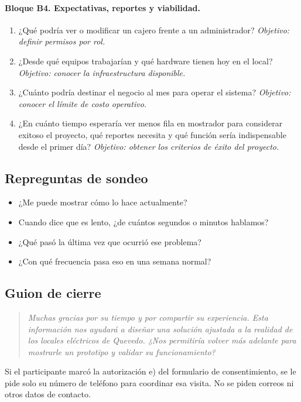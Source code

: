 \paragraph{Bloque B4. Expectativas, reportes y viabilidad.}
\begin{enumerate}[label=B4.\arabic*, leftmargin=*]
\item ¿Qué podría ver o modificar un cajero frente a un administrador? \emph{Objetivo: definir permisos por rol.}
\item ¿Desde qué equipos trabajarían y qué hardware tienen hoy en el local? \emph{Objetivo: conocer la infraestructura disponible.}
\item ¿Cuánto podría destinar el negocio al mes para operar el sistema? \emph{Objetivo: conocer el límite de costo operativo.}
\item ¿En cuánto tiempo esperaría ver menos fila en mostrador para considerar exitoso el proyecto, qué reportes necesita y qué función sería indispensable desde el primer día? \emph{Objetivo: obtener los criterios de éxito del proyecto.}
\end{enumerate}

\subsection*{Repreguntas de sondeo}
\begin{itemize}
\item ¿Me puede mostrar cómo lo hace actualmente?
\item Cuando dice que es lento, ¿de cuántos segundos o minutos hablamos?
\item ¿Qué pasó la última vez que ocurrió ese problema?
\item ¿Con qué frecuencia pasa eso en una semana normal?
\end{itemize}

\subsection*{Guion de cierre}
\begin{quote}\itshape
Muchas gracias por su tiempo y por compartir su experiencia. Esta información nos ayudará a diseñar una solución ajustada a la realidad de los locales eléctricos de Quevedo. ¿Nos permitiría volver más adelante para mostrarle un prototipo y validar su funcionamiento?
\end{quote}

Si el participante marcó la autorización e) del formulario de consentimiento, se le pide solo su número de teléfono para coordinar esa visita. No se piden correos ni otros datos de contacto.
